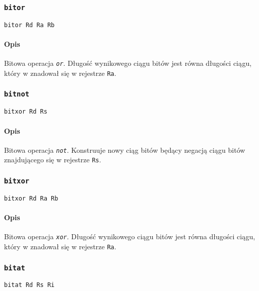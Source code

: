 \subsubsection{\texttt{bitor}}

\begin{lstlisting}
bitor Rd Ra Rb
\end{lstlisting}

\paragraph*{Opis} Bitowa operacja \emph{\texttt{or}}.
Długość wynikowego ciągu bitów jest równa długości ciągu, który w znadował się w
rejestrze \texttt{Ra}.

\subsubsection{\texttt{bitnot}}

\begin{lstlisting}
bitxor Rd Rs
\end{lstlisting}

\paragraph*{Opis} Bitowa operacja \emph{\texttt{not}}.
Konstruuje nowy ciąg bitów będący negacją ciągu bitów znajdującego się w
rejestrze \texttt{Rs}.

\subsubsection{\texttt{bitxor}}

\begin{lstlisting}
bitxor Rd Ra Rb
\end{lstlisting}

\paragraph*{Opis} Bitowa operacja \emph{\texttt{xor}}.
Długość wynikowego ciągu bitów jest równa długości ciągu, który w znadował się w
rejestrze \texttt{Ra}.

\subsubsection{\texttt{bitat}}

\begin{lstlisting}
bitat Rd Rs Ri
\end{lstlisting}

